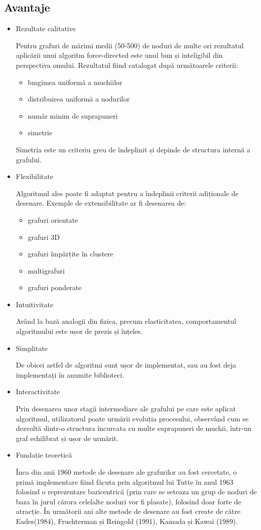 \subsection{Avantaje}
\begin{itemize}
\item Rezultate calitative

Pentru grafuri de mărimi medii (50-500) de noduri de multe ori rezultatul aplicării unui algoritm force-directed este 
unul bun și inteligibil din perspectiva omului. Rezultatul fiind catalogat după următoarele criterii: 
\begin{itemize}
    \item lungimea uniformă a muchiilor
    \item distribuirea uniformă a nodurilor
    \item număr minim de suprapuneri
    \item simetrie
\end{itemize}

Simetria este un criteriu greu de îndeplinit și depinde de structura internă a grafului.
\item Flexibilitate

Algoritmul ales poate fi adaptat pentru a îndeplinii criterii adiționale de desenare. 
Exemple de extensibilitate ar fi desenarea de: 
\begin{itemize}
    \item grafuri orientate
    \item grafuri 3D
    \item grafuri împărțite în clustere
    \item multigrafuri
    \item grafuri ponderate
\end{itemize}
\item Intuitivitate

Având la bază analogii din fizica, precum elasticitatea, comportamentul algoritmului este ușor de prezis și înțeles.
\item Simplitate

De obicei astfel de algoritmi sunt ușor de implementat, sau au fost deja implementați în anumite biblioteci.
\item Interactivitate

Prin desenarea unor stagii intermediare ale grafului pe care este aplicat algoritmul, utilizatorul poate urmării evoluția 
procesului, observând cum se dezvoltă dintr-o structura încurcata cu multe suprapuneri de muchii, într-un graf echilibrat 
și ușor de urmărit.
\item Fundație teoretică

Înca din anii 1960 metode de desenare ale grafurilor au fost cercetate, o primă implementare fiind făcuta 
prin algoritmul lui Tutte în anul 1963 folosind o reprezentare baricentrică (prin care se seteaza un grup de noduri 
de baza în jurul cărora celelalte noduri vor fi plasate), folosind doar forte de atracție. 
În următorii ani alte metode de desenare au fost create de către Eades(1984), Fruchterman și Reingold (1991), Kamada și Kawai (1989).

\end{itemize}

